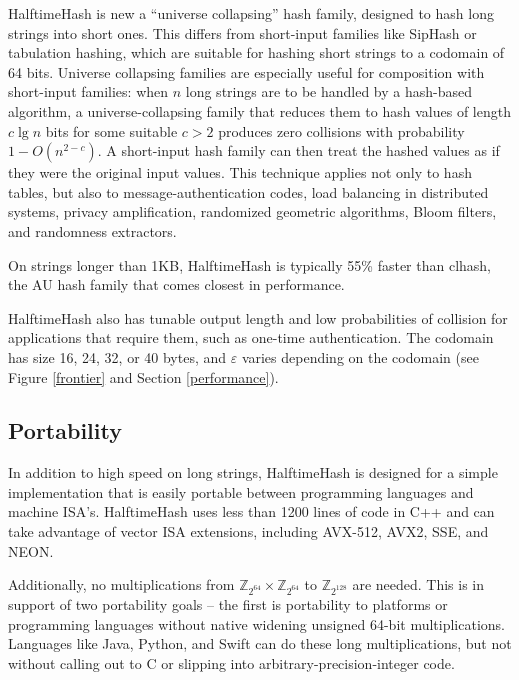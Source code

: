 \documentclass[runningheads]{llncs}
\newcommand{\ints}{\mathbb{Z}}
\begin{document}
HalftimeHash is new a ``universe collapsing'' hash family, designed to hash long strings into short ones. \cite{linear-hash-functions,hashing-without-primes-revisited,cuckoo-journal}
This differs from short-input families like SipHash or tabulation hashing, which are suitable for hashing short strings to a codomain of 64 bits. \cite{siphash,tabulation}
Universe collapsing families are especially useful for composition with short-input families: when $n$ long strings are to be handled by a hash-based algorithm, a universe-collapsing family that reduces them to hash values of length $c \lg n$ bits for some suitable $c > 2$ produces zero collisions with probability $1-O(n^{2-c})$.
A short-input hash family can then treat the hashed values as if they were the original input values. \cite{universe-collapse-linear-probing,siphash,tabulation,simple-hash-functions-work}
This technique applies not only to hash tables, but also to message-authentication codes, load balancing in distributed systems, privacy amplification, randomized geometric algorithms, Bloom filters, and randomness extractors. \cite{poly1305,chord,privacy-amplification,random-closest-pair,simple-hash-functions-work,fuzzy-extractors}

On strings longer than 1KB, HalftimeHash is typically 55\% faster than clhash, the AU hash family that comes closest in performance.

HalftimeHash also has tunable output length and low probabilities of collision for applications that require them, such as one-time authentication. \cite{nacl}
The codomain has size 16, 24, 32, or 40 bytes, and $\varepsilon$ varies depending on the codomain (see Figure \ref{frontier} and Section \ref{performance}).

\subsection{Portability}

In addition to high speed on long strings, HalftimeHash is designed for a simple implementation that is easily portable between programming languages and machine ISA's.
HalftimeHash uses less than 1200 lines of code in C++ and can take advantage of vector ISA extensions, including AVX-512, AVX2, SSE, and NEON.

Additionally, no multiplications from $\ints_{2^{64}} \times \ints_{2^{64}}$ to $\ints_{2^{128}}$ are needed.
This is in support of two portability goals -- the first is portability to platforms or programming languages without native widening unsigned 64-bit multiplications.
Languages like Java, Python, and Swift can do these long multiplications, but not without calling out to C or slipping into arbitrary-precision-integer code.
\end{document}
